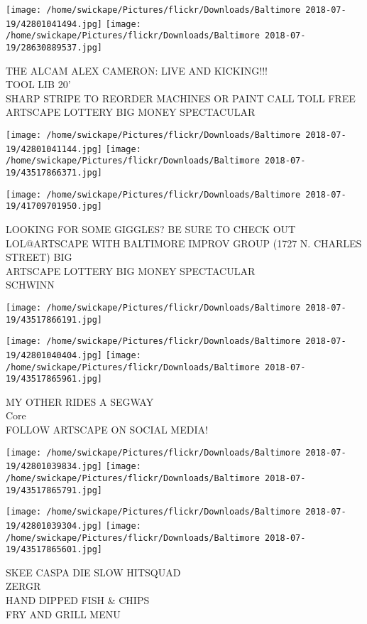 \documentclass[10pt,letterpaper]{article}
\begin{document}
\texttt{[image: /home/swickape/Pictures/flickr/Downloads/Baltimore 2018-07-19/42801041494.jpg]}
\texttt{[image: /home/swickape/Pictures/flickr/Downloads/Baltimore 2018-07-19/28630889537.jpg]}

THE ALCAM ALEX CAMERON: LIVE AND KICKING!!!\\
TOOL LIB 20'\\
SHARP STRIPE TO REORDER MACHINES OR PAINT CALL TOLL FREE\\
ARTSCAPE LOTTERY BIG MONEY SPECTACULAR
\pagebreak

\texttt{[image: /home/swickape/Pictures/flickr/Downloads/Baltimore 2018-07-19/42801041144.jpg]}
\texttt{[image: /home/swickape/Pictures/flickr/Downloads/Baltimore 2018-07-19/43517866371.jpg]}

\texttt{[image: /home/swickape/Pictures/flickr/Downloads/Baltimore 2018-07-19/41709701950.jpg]}

LOOKING FOR SOME GIGGLES?  BE SURE TO CHECK OUT LOL@ARTSCAPE WITH BALTIMORE IMPROV GROUP (1727 N. CHARLES STREET) BIG\\
ARTSCAPE LOTTERY BIG MONEY SPECTACULAR\\
SCHWINN
\pagebreak

\texttt{[image: /home/swickape/Pictures/flickr/Downloads/Baltimore 2018-07-19/43517866191.jpg]}

\vspace{0.25in}
\texttt{[image: /home/swickape/Pictures/flickr/Downloads/Baltimore 2018-07-19/42801040404.jpg]}
\texttt{[image: /home/swickape/Pictures/flickr/Downloads/Baltimore 2018-07-19/43517865961.jpg]}

MY OTHER RIDES A SEGWAY\\
Core\\
FOLLOW ARTSCAPE ON SOCIAL MEDIA!
\pagebreak

\texttt{[image: /home/swickape/Pictures/flickr/Downloads/Baltimore 2018-07-19/42801039834.jpg]}
\texttt{[image: /home/swickape/Pictures/flickr/Downloads/Baltimore 2018-07-19/43517865791.jpg]}

\texttt{[image: /home/swickape/Pictures/flickr/Downloads/Baltimore 2018-07-19/42801039304.jpg]}
\texttt{[image: /home/swickape/Pictures/flickr/Downloads/Baltimore 2018-07-19/43517865601.jpg]}

SKEE CASPA DIE SLOW HITSQUAD\\
ZERGR\\
HAND DIPPED FISH \& CHIPS\\
FRY AND GRILL MENU
\pagebreak
\end{document}
